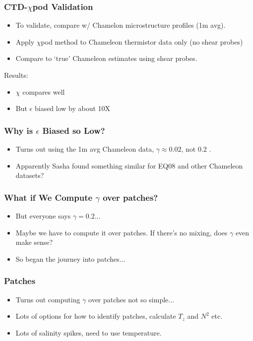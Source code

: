 \documentclass{beamer}
\begin{document}
\begin{frame}
 \frametitle{CTD-$\chi$pod Validation}

   \begin{itemize}
  \item To validate, compare w/ Chamelon microstructure profiles (1m avg).
  \item Apply $\chi$pod method to Chameleon thermistor data only (no shear probes)
  \item Compare to `true' Chameleon estimates using shear probes.
  \end{itemize}

Results:
   \begin{itemize}
  \item $\chi$ compares well
  \item But $\epsilon$ biased low by about 10X
    \end{itemize}

\end{frame}




\begin{frame}
 \frametitle{Why is $\epsilon$ Biased so Low?}

\begin{itemize}
\item Turns out using the 1m avg Chameleon data, $\gamma \approx 0.02$, not 0.2  .
\item Apparently Sasha found something similar for EQ08 and other Chameleon datasets?
\end{itemize}

\end{frame}



\begin{frame}
 \frametitle{What if We Compute $\gamma$ over patches?}
\begin{itemize}
\item But everyone says $\gamma=0.2$...
\item Maybe we have to compute it over patches. If there's no mixing, does $\gamma$ even make sense?
\item So began the journey into patches...
\end{itemize}

\end{frame}





\begin{frame}
 \frametitle{Patches}
\begin{itemize}
\item Turns out computing $\gamma$ over patches not so simple...
\item Lots of options for how to identify patches, calculate $T_z$ and $N^2$ etc.
\item Lots of salinity spikes, need to use temperature.
\end{itemize}

\end{frame}
\end{document}
